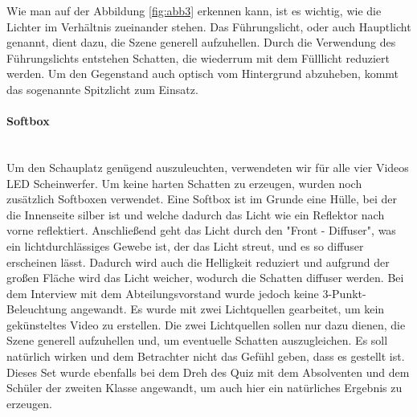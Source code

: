 Wie man auf der Abbildung \ref{fig:abb3} erkennen kann, ist es wichtig, wie die Lichter im Verhältnis zueinander stehen. Das Führungslicht, oder auch Hauptlicht genannt, dient dazu, die Szene generell aufzuhellen. Durch die Verwendung des Führungslichts entstehen Schatten, die wiederrum mit dem Fülllicht reduziert werden. Um den Gegenstand auch optisch vom Hintergrund abzuheben, kommt das sogenannte Spitzlicht zum Einsatz. \citep{lichter}
\paragraph{Softbox}
\leavevmode \\
Um den Schauplatz genügend auszuleuchten, verwendeten wir für alle vier Videos LED Scheinwerfer. Um keine harten Schatten zu erzeugen, wurden noch zusätzlich Softboxen verwendet.\newline
Eine Softbox ist im Grunde eine Hülle, bei der die Innenseite silber ist und welche dadurch das Licht wie ein Reflektor nach vorne reflektiert. Anschließend geht das Licht durch den "Front - Diffuser", was
ein lichtdurchlässiges Gewebe ist, der das Licht streut, und es so diffuser erscheinen lässt. Dadurch wird auch die Helligkeit reduziert und aufgrund der großen Fläche wird das Licht weicher, wodurch die Schatten diffuser werden.\citep{softbox}\newline
Bei dem Interview mit dem Abteilungsvorstand wurde jedoch keine 3-Punkt-Beleuchtung angewandt. Es wurde mit zwei Lichtquellen gearbeitet, um kein gekünsteltes Video zu erstellen. Die zwei Lichtquellen sollen nur dazu dienen, die Szene generell aufzuhellen und, um eventuelle Schatten auszugleichen. Es soll natürlich wirken und dem Betrachter nicht das Gefühl geben, dass es gestellt ist.  Dieses Set wurde ebenfalls bei dem Dreh des Quiz mit dem Absolventen und dem Schüler der zweiten Klasse angewandt, um auch hier ein natürliches Ergebnis zu erzeugen.